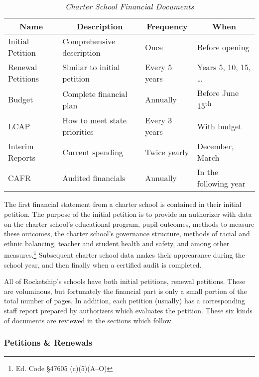 \begin{table}[h]
  \centering\small%
  \caption[Charter School Financial Documents]{\textit{Charter School Financial Documents}}\label{tab:charter-fin-docs}%
  \begin{tabular}{llll}
    \toprule%
    \multicolumn{1}{c}{Name}  & \multicolumn{1}{c}{Description} & \multicolumn{1}{c}{Frequency} & \multicolumn{1}{c}{When} \\
    \midrule%
    Initial Petition  & Comprehensive description    & Once           & Before opening \\
    Renewal Petitions & Similar to initial petition  & Every 5 years  & Years 5, 10, 15, \ldots \\
    Budget            & Complete financial plan      & Annually       & Before June 15\textsuperscript{th} \\
    LCAP              & How to meet state priorities & Every 3 years  & With budget\\
    Interim Reports   & Current spending             & Twice yearly   & December, March \\
    CAFR              & Audited financials           & Annually       & In the following year \\
    \bottomrule%
  \end{tabular}
\end{table}%

The first financial statement from a charter school is contained in their initial petition. The purpose of the initial petition is to provide an authorizer with data on the charter school's educational program, pupil outcomes, methods to measure these outcomes, the charter school's governance structure, methods of racial and ethnic balancing, teacher and student health and safety, and among other measures.\footnote{Ed. Code §47605 (c)(5)(A–O)} Subsequent charter school data makes their apprearance during the school year, and then finally when a certified audit is completed.

All of Rocketship's schools have both initial petitions, renewal petitions. These are voluminous, but fortunately the financial part is only a small portion of the total number of pages. In addition, each petition (usually) has a corresponding staff report prepared by authorizers which evaluates the petition. These six kinds of documents are reviewed in the sections which follow.

\subsubsection{Petitions \& Renewals}\label{sec:cs-petitions-renewals}\indent

